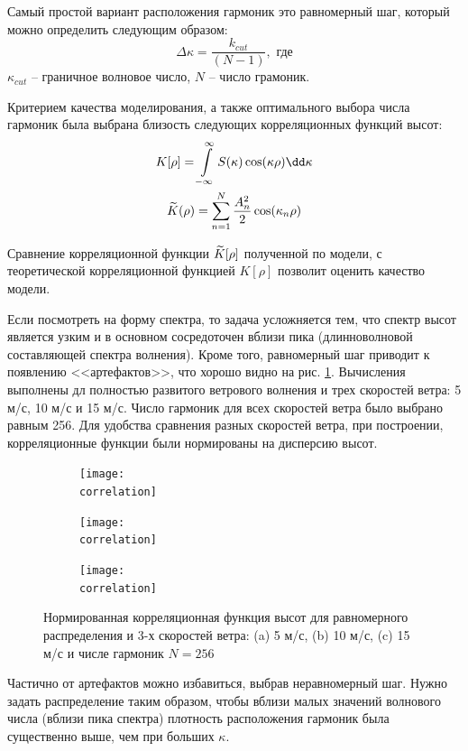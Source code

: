 Самый простой вариант расположения гармоник это равномерный шаг, который можно определить следующим образом:
\begin{equation}
    \Delta \kappa = \frac{k_{cut}}{(N-1)}, \text{ где}
\end{equation}
$\kappa_{cut}$ -- граничное волновое число, $N$ -- число грамоник.



Критерием качества моделирования, а также оптимального выбора числа гармоник
была выбрана близость следующих корреляционных функций высот:
\begin{equation}
    \begin{gathered}
        \label{eq:KK}
        K[\rho] = \int\limits_{-\infty}^{\infty} S(\kappa) \cos(\kappa\rho) \dd \kappa\\
        \tK(\rho) = \sum\limits_{n=1}^{N} \frac{A_n^2}{2} \cos(\kappa_n \rho)
    \end{gathered}
\end{equation}




Сравнение корреляционной функции $\widetilde K[\rho]$ полученной по модели, с
теоретической корреляционной функцией $K[\rho]$   позволит оценить качество
модели.  

Если посмотреть на форму спектра, то задача усложняется тем,
что спектр высот является узким и в основном сосредоточен вблизи пика
(длинноволновой составляющей спектра волнения).  Кроме того, равномерный шаг
приводит к появлению <<артефактов>>, что хорошо видно на рис.
\ref{fig:corr_h_lin}.
Вычисления выполнены дл полностью развитого ветрового волнения и трех скоростей
ветра: 5 м/с, 10 м/с и 15 м/с. Число гармоник для всех скоростей ветра было
выбрано равным 256. Для удобства сравнения разных скоростей ветра, при
построении, корреляционные функции были нормированы на дисперсию высот.
\def\correlation{fig/water/correlation}
\begin{figure}[ht]
    \centering
    \begin{subfigure}{0.49\linewidth}
        \centering
        \texttt{[image: \\correlation]}
    \end{subfigure}
    \hfill
    \begin{subfigure}{0.49\linewidth}
        \centering
        \texttt{[image: \\correlation]}
    \end{subfigure}
    \begin{subfigure}{0.49\linewidth}
        \centering
        \texttt{[image: \\correlation]}
    \end{subfigure}
    \caption{Нормированная корреляционная функция высот для равномерного распределения и 3-х
    скоростей ветра: (a) 5 м/с,  (b) 10 м/с, (c) 15 м/с и числе
гармоник $N=256$}
    \label{fig:corr_h_lin}
\end{figure}
Частично от артефактов можно избавиться, выбрав неравномерный шаг. Нужно задать
распределение таким образом, чтобы вблизи малых значений волнового числа
(вблизи пика спектра) плотность расположения гармоник была существенно выше,
чем при больших $\kappa$.

